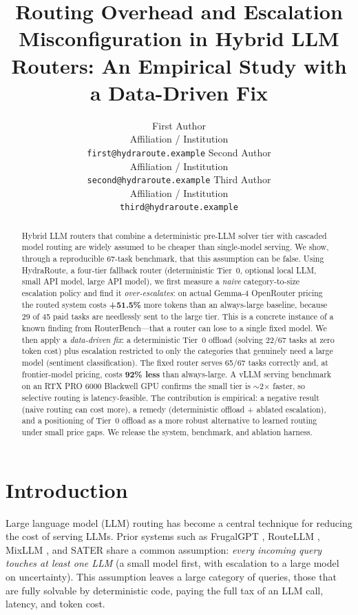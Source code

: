 \documentclass[11pt]{article}
\title{Routing Overhead and Escalation Misconfiguration in Hybrid LLM Routers: An Empirical Study with a Data-Driven Fix}
\author{
  First Author \\
  Affiliation / Institution \\
  \texttt{first@hydraroute.example}
  \And
  Second Author \\
  Affiliation / Institution \\
  \texttt{second@hydraroute.example}
  \And
  Third Author \\
  Affiliation / Institution \\
  \texttt{third@hydraroute.example}
}
\date{}
\newcommand{\system}{HydraRoute\xspace}
\begin{document}
\maketitle

\begin{abstract}
Hybrid LLM routers that combine a deterministic pre-LLM solver tier with cascaded model
routing are widely assumed to be cheaper than single-model serving. We show, through a
reproducible 67-task benchmark, that this assumption can be false. Using \system, a
four-tier fallback router (deterministic Tier~0, optional local LLM, small API model,
large API model), we first measure a \emph{naive} category-to-size escalation policy and
find it \emph{over-escalates}: on actual Gemma-4 OpenRouter pricing the routed system
costs \textbf{+51.5\%} more tokens than an always-large baseline, because 29 of 45 paid
tasks are needlessly sent to the large tier. This is a concrete instance of a known
finding from RouterBench---that a router can lose to a single fixed model. We then apply a
\emph{data-driven fix}: a deterministic Tier~0 offload (solving 22/67 tasks at zero token
cost) plus escalation restricted to only the categories that genuinely need a large model
(sentiment classification). The fixed router serves 65/67 tasks correctly and, at
frontier-model pricing, costs \textbf{92\% less} than always-large. A vLLM serving
benchmark on an RTX PRO 6000 Blackwell GPU confirms the small tier is $\sim$2$\times$
faster, so selective routing is latency-feasible. The contribution is empirical: a
negative result (naive routing can cost more), a remedy (deterministic offload + ablated
escalation), and a positioning of Tier~0 offload as a more robust alternative to learned
routing under small price gaps. We release the system, benchmark, and ablation harness.
\end{abstract}

\section{Introduction}
\label{sec:intro}

Large language model (LLM) routing has become a central technique for reducing the cost of serving LLMs. Prior systems such as FrugalGPT \cite{chen2023frugalgpt}, RouteLLM \cite{ong2024routellm}, MixLLM \cite{jiang2024mixllm}, and SATER \cite{shen2025sater} share a common assumption: \emph{every incoming query touches at least one LLM} (a small model first, with escalation to a large model on uncertainty). This assumption leaves a large category of queries, those that are fully solvable by deterministic code, paying the full tax of an LLM call, latency, and token cost.
\end{document}
